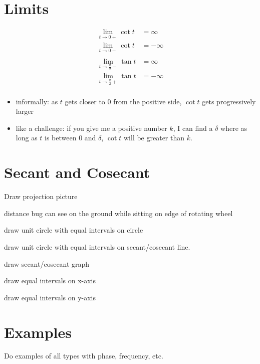 \documentclass{exam}
\begin{document}
  \section{Limits}
  \begin{align*}
    \lim_{t \to 0+} \cot t & = \infty \\
    \lim_{t \to 0-} \cot t & = -\infty \\
    \\
    \lim_{t \to \frac{\pi}{2}-} \tan t & = \infty \\
    \lim_{t \to \frac{\pi}{2}+} \tan t & = -\infty \\
  \end{align*}

  \begin{itemize}
    \item informally: as $t$ gets closer to 0 from the positive side, $\cot t$ gets progressively larger
    \item like a challenge: if you give me a positive number $k$, I can find a $\delta$ where as long as $t$ is between 0 and
      $\delta$, $\cot t$ will be greater than $k$.
  \end{itemize}

  \section{Secant and Cosecant}

  \begin{itemize*}
    \item Draw projection picture 
    \item distance bug can see on the ground while sitting on edge of rotating wheel
    \item draw unit circle with equal intervals on circle
    \item draw unit circle with equal intervals on secant/cosecant line.
    \item draw secant/cosecant graph
    \item draw equal intervals on x-axis 
    \item draw equal intervals on y-axis
  \end{itemize*}

  \section{Examples}

  Do examples of all types with phase, frequency, etc.
\end{document}
